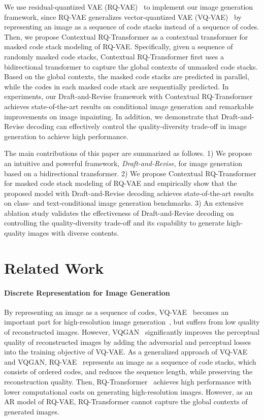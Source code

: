 \documentclass{article}
\begin{document}
We use residual-quantized VAE (RQ-VAE)~\cite{RQVAE} to implement our image generation framework, since RQ-VAE generalizes vector-quantized VAE (VQ-VAE)~\cite{VQVAE} by representing an image as a sequence of code stacks instead of a sequence of codes.
Then, we propose Contextual RQ-Transformer as a contextual transformer for masked code stack modeling of RQ-VAE. 
Specifically, given a sequence of randomly masked code stacks, Contextual RQ-Transformer first uses a bidirectional transformer to capture the global contexts of unmasked code stacks.
Based on the global contexts, the masked code stacks are predicted in parallel, while the codes in each masked code stack are sequentially predicted.
In experiments, our Draft-and-Revise framework with Contextual RQ-Transformer achieves state-of-the-art results on conditional image generation and remarkable improvements on image inpainting. 
In addition, we demonstrate that Draft-and-Revise decoding can effectively control the quality-diversity trade-off in image generation to achieve high performance.

The main contributions of this paper are summarized as follows.
1) We propose an intuitive and powerful framework, \emph{Draft-and-Revise}, for image generation based on a bidirectional transformer.
2) We propose Contextual RQ-Transformer for masked code stack modeling of RQ-VAE and empirically show that the proposed model with Draft-and-Revise decoding achieves state-of-the-art results on class- and text-conditional image generation benchmarks.
3) An extensive ablation study validates the effectiveness of Draft-and-Revise decoding on controlling the quality-diversity trade-off and its capability to generate high-quality images with diverse contents.





\section{Related Work}
\paragraph{Discrete Representation for Image Generation}
By representing an image as a sequence of codes, VQ-VAE~\cite{VQVAE} becomes an important part for high-resolution image generation~\cite{MaskGIT,cogview,VQDiff,RQVAE,DALL-E,VQVAE}, but suffers from low quality of reconstructed images.
However, VQGAN~\cite{VQGAN} significantly improves the perceptual quality of reconstructed images by adding the adversarial and perceptual losses into the training objective of VQ-VAE.
As a generalized approach of VQ-VAE and VQGAN, RQ-VAE~\cite{RQVAE} represents an image as a sequence of code stacks, which consists of ordered codes, and reduces the sequence length, while preserving the reconstruction quality.
Then, RQ-Transformer~\cite{RQVAE} achieves high performance with lower computational costs on generating high-resolution images.
However, as an AR model of RQ-VAE, RQ-Transformer cannot capture the global contexts of generated images.
\end{document}
